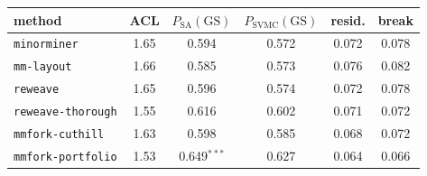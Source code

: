 \begin{tabular}{lccccc}
\toprule
method & ACL & $P_{\mathrm{SA}}(\mathrm{GS})$ & $P_{\mathrm{SVMC}}(\mathrm{GS})$ & resid. & break \\
\midrule
\texttt{minorminer} & 1.65 & 0.594 & 0.572 & 0.072 & 0.078 \\
\texttt{mm-layout} & 1.66 & 0.585 & 0.573 & 0.076 & 0.082 \\
\texttt{reweave} & 1.65 & 0.596 & 0.574 & 0.072 & 0.078 \\
\texttt{reweave-thorough} & 1.55 & 0.616 & 0.602 & 0.071 & 0.072 \\
\texttt{mmfork-cuthill} & 1.63 & 0.598 & 0.585 & 0.068 & 0.072 \\
\texttt{mmfork-portfolio} & 1.53 & 0.649$^{***}$ & 0.627 & 0.064 & 0.066 \\
\bottomrule
\end{tabular}
